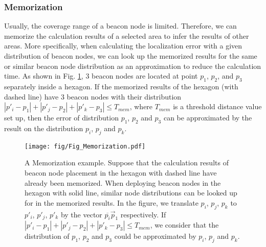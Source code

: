 \documentclass[10pt, conference, letterpaper]{IEEEtran}
\begin{document}
\subsubsection{Memorization} \label{memorization}
Usually, the coverage range of a beacon node is limited. Therefore, we can memorize the calculation results of a selected area to infer the results of other areas. More specifically, when calculating the localization error with a given distribution of beacon nodes, we can look up the memorized results for the same or similar beacon node distribution as an approximation to reduce the calculation time. As shown in Fig. \ref{Fig_Memorization}, $3$ beacon nodes are located at point $p_1$, $p_2$, and $p_3$ separately inside a hexagon. If the memorized results of the hexagon (with dashed line) have $3$ beacon nodes with their distribution $|p'_i-p_1|+|p'_j-p_2|+|p'_k-p_3| \leq T_{mem}$, where $T_{mem}$ is a threshold distance value set up, then the error of distribution $p_1$, $p_2$ and $p_3$ can be approximated by the result on the distribution $p_i$, $p_j$ and $p_k$.
\begin{figure}
\centering
\texttt{[image: fig/Fig\_Memorization.pdf]}\\
\caption{\textrm{A Memorization example. Suppose that the calculation results of beacon node placement in the hexagon with dashed line have already been memorized. When deploying beacon nodes in the hexagon with solid line, similar node distributions can be looked up for in the memorized results. In the figure, we translate $p_i$, $p_j$, $p_k$ to $p'_i$, $p'_j$, $p'_k$ by the vector $\overline{p_i}\vec{p}_1$ respectively. If $|p'_i-p_1|+|p'_j-p_2|+|p'_k-p_3| \leq T_{mem}$, we consider that the distribution of $p_1$, $p_2$ and $p_3$ could be approximated by $p_i$, $p_j$ and $p_k$.}}
\label{Fig_Memorization}
\end{figure}
\end{document}
